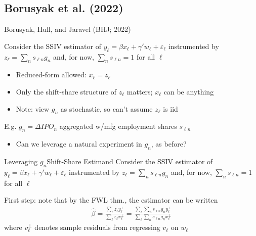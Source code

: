 \documentclass[t]{beamer}
\begin{document}
\subsection{Borusyak et al. (2022)}
\begin{frame}{Borusyak, Hull, and Jaravel (BHJ; 2022)}

Consider the SSIV estimator of $y_\ell=\beta x_\ell+\gamma'w_\ell+\varepsilon_\ell$ instrumented by $z_\ell=\sum_n s_{\ell n}g_n$ and, for now, $\sum_n s_{\ell n}=1$ for all $\ell$

\smallskip
	\begin{itemize}
	\item Reduced-form allowed: $x_\ell=z_\ell$ \smallskip
	\item Only the shift-share structure of $z_\ell$ matters; $x_\ell$ can be anything 
	\smallskip
	\item Note: view $g_n$ as stochastic, so can't assume $z_\ell$ is iid
	\end{itemize}

\medskip\pause
E.g. $g_n= \Delta IPO_{n}$ aggregated w/mfg employment shares $s_{\ell n}$\smallskip
\begin{itemize}
\item Can we leverage a natural experiment in $g_n$, as before?
\end{itemize}
\end{frame}

\begin{frame}{Leveraging $g_n$}{Shift-Share Estimand}
\vspace{-0.2cm}
Consider the SSIV estimator of $y_\ell=\beta x_\ell+\gamma'w_\ell+\varepsilon_\ell$ instrumented by $z_\ell=\sum_n s_{\ell n}g_n$ and, for now, $\sum_n s_{\ell n}=1$ for all $\ell$

\vspace{5mm}
First step: note that by the FWL thm., the estimator can be written
\begin{align*}
\hat{\beta}=\frac{\sum_\ell z_\ell y_\ell^\perp}{\sum_\ell z_\ell x_\ell^\perp}=\frac{\sum_\ell \sum_n s_{\ell n}g_n y_\ell^\perp}{\sum_\ell \sum_n s_{\ell n}g_n x_\ell^\perp}
\end{align*}
where $v_\ell^\perp$ denotes sample residuals from regressing $v_\ell$ on $w_\ell$

\end{frame}
\end{document}
